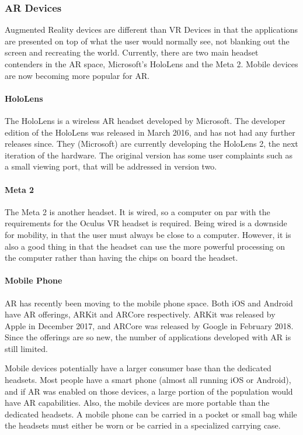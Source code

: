 
\subsubsection{AR Devices}

	Augmented Reality devices are different than VR Devices in that the applications are presented on top of what the user would normally see, not blanking out the screen and recreating the world.  Currently, there are two main headset contenders in the AR space, Microsoft's HoloLens and the Meta 2.  Mobile devices are now becoming more popular for AR.

	\paragraph{HoloLens}

		The HoloLens is a wireless AR headset developed by Microsoft.  The developer edition of the HoloLens was released in March 2016, and has not had any further releases since.  They (Microsoft) are currently developing the HoloLens 2, the next iteration of the hardware.  The original version has some user complaints such as a small viewing port, that will be addressed in version two.  

	\paragraph{Meta 2}

		The Meta 2 is another headset.  It is wired, so a computer on par with the requirements for the Oculus VR headset is required.  Being wired is a downside for mobility, in that the user must always be close to a computer.  However, it is also a good thing in that the headset can use the more powerful processing on the computer rather than having the chips on board the headset.

	\paragraph{Mobile Phone}

		AR has recently been moving to the mobile phone space.  Both iOS and Android have AR offerings, ARKit and ARCore respectively.  ARKit was released by Apple in December 2017, and ARCore was released by Google in February 2018.  Since the offerings are so new, the number of applications developed with AR is still limited.  
		
		Mobile devices potentially have a larger consumer base than the dedicated headsets.  Most people have a smart phone (almost all running iOS or Android), and if AR was enabled on those devices, a large portion of the population would have AR capabilities.  Also, the mobile devices are more portable than the dedicated headsets.  A mobile phone can be carried in a pocket or small bag while the headsets must either be worn or be carried in a specialized carrying case.  
		
